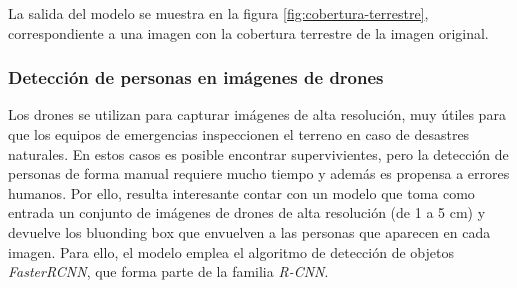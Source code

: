La salida del modelo se muestra en la figura \ref{fig:cobertura-terrestre}, correspondiente a una imagen con la cobertura terrestre de la imagen original.

\subsubsection{Detección de personas en imágenes de drones}
Los drones se utilizan para capturar imágenes de alta resolución, muy útiles para que los equipos de emergencias inspeccionen el terreno en caso de desastres naturales.
En estos casos es posible encontrar supervivientes, pero la detección de personas de forma manual requiere mucho tiempo y además es propensa a errores humanos.
Por ello, resulta interesante contar con un modelo que toma como entrada un conjunto de imágenes de drones de alta resolución (de 1 a 5 cm) y 
devuelve los bluonding box que envuelven a las personas que aparecen en cada imagen.
Para ello, el modelo emplea el algoritmo de detección de objetos \textit{FasterRCNN}, que forma parte de la familia \textit{R-CNN}.

